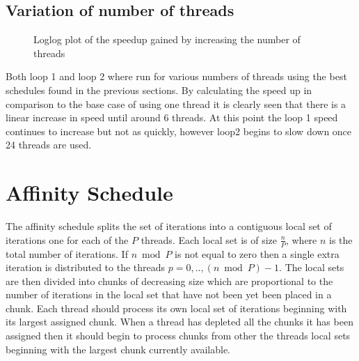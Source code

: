 \documentclass[12pt]{article} %
\begin{document}
\subsection{Variation of number of threads}
 
\begin{figure}[H] %
\caption{Loglog plot of the speedup gained by increasing the number of threads}
\label{fig:speciation}
\end{figure}

Both loop 1 and loop 2 where run for various numbers of threads using the best schedules found in the previous sections. By calculating the speed up in comparison to the base case of using one thread it is clearly seen that there is a linear increase in speed until around 6 threads. At this point the loop 1 speed continues to increase but not as quickly, however loop2 begins to slow down once 24 threads are used. 



\section{Affinity Schedule} %

The affinity schedule splits the set of iterations into a contiguous local set of iterations one for each of the $P$ threads. Each local set is of size $\frac{n}{P}$, where $n$ is the total number of iterations. If $n \bmod P$ is not equal to zero then a single extra iteration is distributed to the threads $p = 0,..,(n \bmod P) - 1$. The local sets are then divided into chunks of decreasing size which are proportional to the number of iterations in the local set that have not been yet been placed in a chunk. Each thread should process its own local set of iterations beginning with its largest assigned chunk. When a thread has depleted all the chunks it has been assigned then it should begin to process chunks from other the threads local sets beginning with the largest chunk currently available.
\end{document}
